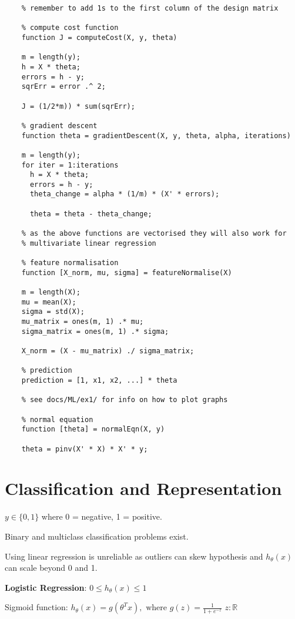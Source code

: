 \documentclass[12pt, a4paper]{article}
\begin{document}
    \begin{lstlisting}
    % remember to add 1s to the first column of the design matrix

    % compute cost function
    function J = computeCost(X, y, theta)

    m = length(y);    
    h = X * theta;
    errors = h - y;
    sqrErr = error .^ 2;

    J = (1/2*m)) * sum(sqrErr);

    % gradient descent
    function theta = gradientDescent(X, y, theta, alpha, iterations)

    m = length(y);
    for iter = 1:iterations
      h = X * theta;
      errors = h - y;
      theta_change = alpha * (1/m) * (X' * errors);

      theta = theta - theta_change;

    % as the above functions are vectorised they will also work for
    % multivariate linear regression

    % feature normalisation
    function [X_norm, mu, sigma] = featureNormalise(X)

    m = length(X);
    mu = mean(X);
    sigma = std(X);
    mu_matrix = ones(m, 1) .* mu;
    sigma_matrix = ones(m, 1) .* sigma;

    X_norm = (X - mu_matrix) ./ sigma_matrix;

    % prediction
    prediction = [1, x1, x2, ...] * theta  

    % see docs/ML/ex1/ for info on how to plot graphs
    
    % normal equation
    function [theta] = normalEqn(X, y)

    theta = pinv(X' * X) * X' * y;
    \end{lstlisting}

    \newpage

\section{Classification and Representation}

  $y \in\{0,1\}$ where 0 = negative, 1 = positive.

  Binary and multiclass classification problems exist. 

  Using linear regression is unreliable as outliers can skew hypothesis and
  $h_\theta(x)$ can scale beyond 0 and 1.

  \textbf{Logistic Regression}: $0 \leq h_\theta(x) \leq 1$

  Sigmoid function: $h_\theta(x) = g(\theta^Tx), \text{ where } 
  g(z) = \frac{1}{1+e^{-z}}$  $z: \mathbb{R}$
\end{document}
